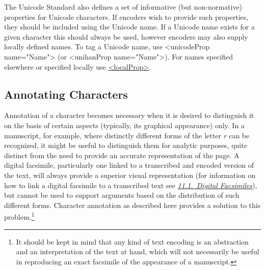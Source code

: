 The Unicode Standard also defines a set of informative (but non-normative) properties for Unicode characters. If encoders wish to provide such properties, they should be included using the Unicode name. If a Unicode name exists for a given character this should always be used, however encoders may also supply locally defined names. To tag a Unicode name, use <unicodeProp name="Name"> (or <unihanProp name="Name">). For names specified elsewhere or specified locally use \hyperref[TEI.localProp]{<localProp>}.
\subsection[{Annotating Characters}]{Annotating Characters}\label{D25-30}\par
Annotation of a character becomes necessary when it is desired to distinguish it on the basis of certain aspects (typically, its graphical appearance) only. In a manuscript, for example, where distinctly different forms of the letter \textit{r} can be recognized, it might be useful to distinguish them for analytic purposes, quite distinct from the need to provide an accurate representation of the page. A digital facsimile, particularly one linked to a transcribed and encoded version of the text, will always provide a superior visual representation (for information on how to link a digital facsimile to a transcribed text see \textit{\hyperref[PHFAX]{11.1.\ Digital Facsimiles}}), but cannot be used to support arguments based on the distribution of such different forms. Character annotation as described here provides a solution to this problem.\footnote{It should be kept in mind that any kind of text encoding is an abstraction and an interpretation of the text at hand, which will not necessarily be useful in reproducing an exact facsimile of the appearance of a manuscript.}\par
